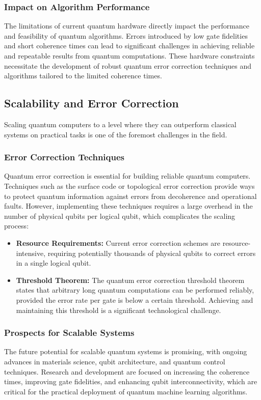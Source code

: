 \documentclass{book}
\begin{document}
\subsubsection{Impact on Algorithm Performance}
The limitations of current quantum hardware directly impact the performance and feasibility of quantum algorithms. Errors introduced by low gate fidelities and short coherence times can lead to significant challenges in achieving reliable and repeatable results from quantum computations. These hardware constraints necessitate the development of robust quantum error correction techniques and algorithms tailored to the limited coherence times.

\subsection{Scalability and Error Correction}
Scaling quantum computers to a level where they can outperform classical systems on practical tasks is one of the foremost challenges in the field.

\subsubsection{Error Correction Techniques}
Quantum error correction is essential for building reliable quantum computers. Techniques such as the surface code or topological error correction provide ways to protect quantum information against errors from decoherence and operational faults. However, implementing these techniques requires a large overhead in the number of physical qubits per logical qubit, which complicates the scaling process:
\begin{itemize}
    \item \textbf{Resource Requirements:} Current error correction schemes are resource-intensive, requiring potentially thousands of physical qubits to correct errors in a single logical qubit.
    \item \textbf{Threshold Theorem:} The quantum error correction threshold theorem states that arbitrary long quantum computations can be performed reliably, provided the error rate per gate is below a certain threshold. Achieving and maintaining this threshold is a significant technological challenge.
\end{itemize}

\subsubsection{Prospects for Scalable Systems}
The future potential for scalable quantum systems is promising, with ongoing advances in materials science, qubit architecture, and quantum control techniques. Research and development are focused on increasing the coherence times, improving gate fidelities, and enhancing qubit interconnectivity, which are critical for the practical deployment of quantum machine learning algorithms.
\end{document}
